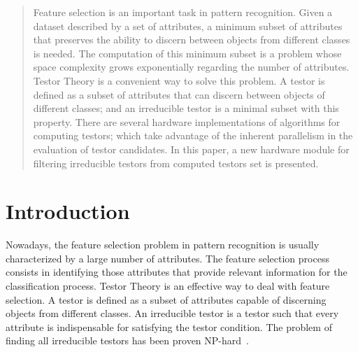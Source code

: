 \documentclass[conference]{IEEEtran}
\begin{document}
\begin{abstract}
	Feature selection is an important task in pattern recognition. Given a dataset described by a set of attributes, a minimum subset of attributes that preserves the ability to discern between objects from different classes is needed. The computation of this minimum subset is a problem whose space complexity grows
exponentially regarding the number of attributes. Testor Theory is a convenient way to solve this problem. A testor is defined as a subset of attributes that can discern between objects of different classes; and an irreducible testor is a minimal subset with this property. There are several hardware implementations of algorithms for computing testors; which take advantage of the inherent parallelism in the evaluation of testor candidates. In this paper, a new hardware module for filtering irreducible testors from computed testors set is presented.
\end{abstract}





%
\IEEEpeerreviewmaketitle



\section{Introduction}
Nowadays, the feature selection problem in pattern recognition is usually characterized by a large number of 
attributes. The feature selection process consists in identifying those attributes that provide relevant 
information for the classification process. 
Testor Theory is an effective way to deal with feature selection.
 A testor is defined as a subset of attributes capable of discerning objects from 
different classes. An irreducible testor is a testor such that every attribute is indispensable for satisfying 
the testor condition. The problem of finding all irreducible testors has been proven NP-hard~\cite{Skowron92}.
\end{document}
